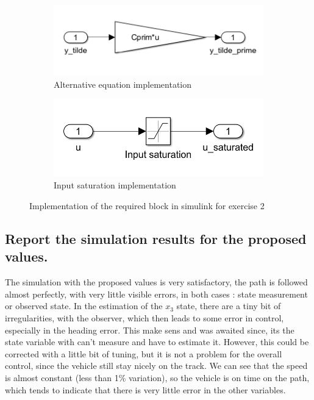 \begin{figure}[H]
\begin{subfigure}[b]{0.45\textwidth}
         \centering
         \includegraphics[width=\textwidth]{Latex report/image/ex2altEq.png}
         \caption{Alternative equation implementation}
         \label{fig:altEqSim}
     \end{subfigure}
     \begin{subfigure}[b]{0.45\textwidth}
         \centering
         \includegraphics[width=\textwidth]{Latex report/image/ex2Saturation.png}
         \caption{Input saturation implementation}
         \label{fig:simSat}
     \end{subfigure}
    \caption{Implementation of the required block in simulink for exercise 2}
    \label{fig:simImplEx2}
\end{figure}

\subsection{Report the simulation results for the proposed values.}
The simulation with the proposed values is very satisfactory, the path is followed almost perfectly, with very little visible errors, in both cases : state measurement or observed state. In the estimation of the $x_3$ state, there are a tiny bit of irregularities, with the observer, which then leads to some error in control, especially in the heading error. This make sens and was awaited since, its the state variable with can't measure and have to estimate it. However, this could be corrected with a little bit of tuning, but it is not a problem for the overall control, since the vehicle still stay nicely on the track. We can see that the speed is almost constant (less than 1\% variation), so the vehicle is on time on the path, which tends to indicate that there is very little error in the other variables.

